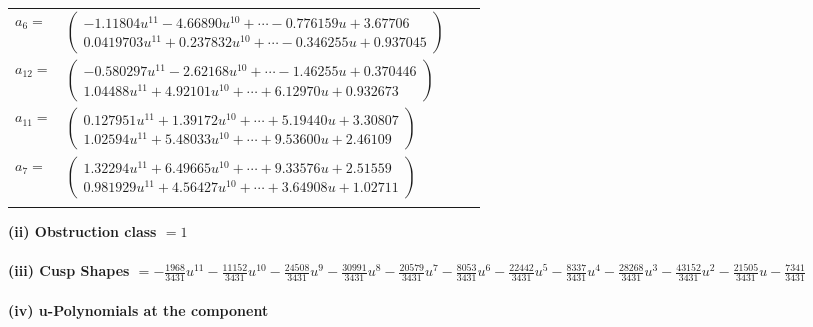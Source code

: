 \documentclass[1p]{elsarticle_modified}
\theoremstyle{definition}
\begin{document}
\begin{tabular}{m{7pt} m{180pt} m{7pt} m{180pt} }
\flushright $a_{6}=$&$\begin{pmatrix}-1.11804 u^{11}-4.66890 u^{10}+\cdots-0.776159 u+3.67706\\0.0419703 u^{11}+0.237832 u^{10}+\cdots-0.346255 u+0.937045\end{pmatrix}$ \\
\flushright $a_{12}=$&$\begin{pmatrix}-0.580297 u^{11}-2.62168 u^{10}+\cdots-1.46255 u+0.370446\\1.04488 u^{11}+4.92101 u^{10}+\cdots+6.12970 u+0.932673\end{pmatrix}$ \\
\flushright $a_{11}=$&$\begin{pmatrix}0.127951 u^{11}+1.39172 u^{10}+\cdots+5.19440 u+3.30807\\1.02594 u^{11}+5.48033 u^{10}+\cdots+9.53600 u+2.46109\end{pmatrix}$ \\
\flushright $a_{7}=$&$\begin{pmatrix}1.32294 u^{11}+6.49665 u^{10}+\cdots+9.33576 u+2.51559\\0.981929 u^{11}+4.56427 u^{10}+\cdots+3.64908 u+1.02711\end{pmatrix}$\\&\end{tabular}
\flushleft \textbf{(ii) Obstruction class $= 1$}\\~\\
\flushleft \textbf{(iii) Cusp Shapes $= -\frac{1968}{3431} u^{11}-\frac{11152}{3431} u^{10}-\frac{24508}{3431} u^9-\frac{30991}{3431} u^8-\frac{20579}{3431} u^7-\frac{8053}{3431} u^6-\frac{22442}{3431} u^5-\frac{8337}{3431} u^4-\frac{28268}{3431} u^3-\frac{43152}{3431} u^2-\frac{21505}{3431} u-\frac{7341}{3431}$}\\~\\
\newpage\renewcommand{\arraystretch}{1}
\flushleft \textbf{(iv) u-Polynomials at the component}\newline \\
\end{document}
